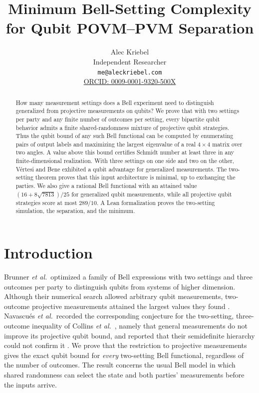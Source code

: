\documentclass[11pt]{article}
\title{\bfseries Minimum Bell-Setting Complexity\\
for Qubit POVM--PVM Separation}
\author{Alec Kriebel\\
\small Independent Researcher\\
\small \texttt{me@aleckriebel.com}\\
\small \href{https://orcid.org/0009-0001-9320-500X}{ORCID: 0009-0001-9320-500X}}
\date{}
\theoremstyle{definition}
\begin{document}
\ifdefined\REVIEWVERSION
\linenumbers
\fi
\maketitle

\begin{abstract}
How many measurement settings does a Bell experiment need to distinguish
generalized from projective measurements on qubits?
We prove that with two settings per party and any finite number of outcomes
per setting, every bipartite qubit behavior admits a finite shared-randomness
mixture of projective qubit strategies. Thus the qubit bound of any such
Bell functional can be computed by enumerating pairs of output labels and
maximizing the largest eigenvalue of a real \(4\times4\) matrix over two
angles. A value above this bound certifies Schmidt number at least three
in any finite-dimensional realization.
With three settings on one side and two on the other, V\'ertesi and Bene
exhibited a qubit advantage for generalized measurements. The two-setting
theorem proves that this input architecture is minimal, up to exchanging
the parties. We also give a rational Bell functional with an attained
value \((16+8\sqrt{7813})/25\) for generalized qubit measurements,
while all projective qubit strategies score at most \(289/10\). A Lean formalization proves the two-setting simulation,
the separation, and the minimum.
\end{abstract}

\section{Introduction}

Brunner \emph{et al.}\ optimized a family of Bell expressions with two
settings and three outcomes per party to distinguish qubits from systems
of higher dimension. Although their numerical search allowed arbitrary qubit
measurements, two-outcome projective measurements attained the largest values
they found \cite{brunner2008dim}. Navascu\'es \emph{et al.}\ recorded the
corresponding conjecture for the two-setting, three-outcome inequality of
Collins \emph{et al.}\ \cite{collins2002}, namely that general measurements do
not improve its projective qubit bound, and reported that their semidefinite
hierarchy could not confirm it \cite{navascues2015}. We prove that the
restriction to projective measurements gives the exact qubit bound for
\emph{every} two-setting Bell functional, regardless of the number of outcomes.
The result concerns the
usual Bell model in which shared randomness can select the state and both
parties' measurements before the inputs arrive.
\end{document}
